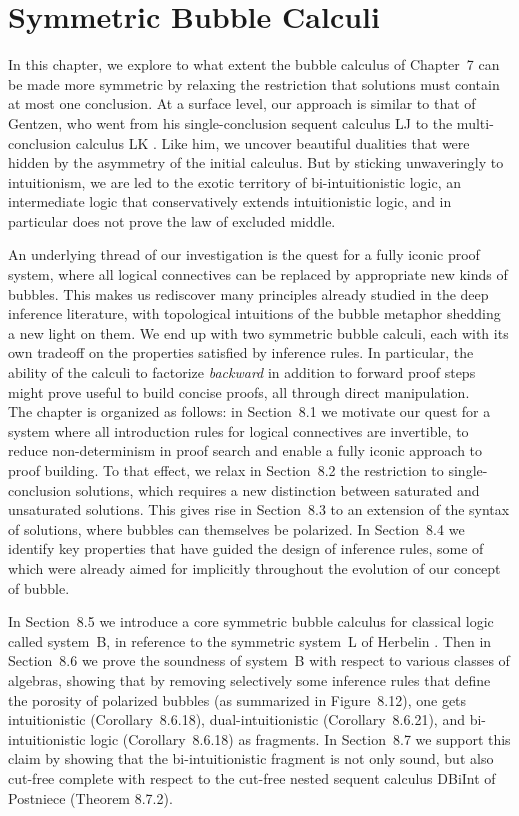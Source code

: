 \documentclass[11pt]{article}
\begin{document}
\section{Symmetric Bubble Calculi}

In this chapter, we explore to what extent the bubble calculus of Chapter~7 can be made more symmetric by relaxing the restriction that solutions must contain at most one conclusion. At a surface level, our approach is similar to that of Gentzen, who went from his single-conclusion sequent calculus LJ to the multi-conclusion calculus LK \cite{gentzen_untersuchungen_1935}. Like him, we uncover beautiful dualities that were hidden by the asymmetry of the initial calculus. But by sticking unwaveringly to intuitionism, we are led to the exotic territory of bi-intuitionistic logic, an intermediate logic that conservatively extends intuitionistic logic, and in particular does not prove the law of excluded middle.

An underlying thread of our investigation is the quest for a fully iconic proof system, where all logical connectives can be replaced by appropriate new kinds of bubbles. This makes us rediscover many principles already studied in the deep inference literature, with topological intuitions of the bubble metaphor shedding a new light on them. We end up with two symmetric bubble calculi, each with its own tradeoff on the properties satisfied by inference rules. In particular, the ability of the calculi to factorize \emph{backward} in addition to forward proof steps might prove useful to build concise proofs, all through direct manipulation.
\\

The chapter is organized as follows: in Section~8.1 we motivate our quest for a system where all introduction rules for logical connectives are invertible, to reduce non-determinism in proof search and enable a fully iconic approach to proof building. To that effect, we relax in Section~8.2 the restriction to single-conclusion solutions, which requires a new distinction between saturated and unsaturated solutions. This gives rise in Section~8.3 to an extension of the syntax of solutions, where bubbles can themselves be polarized. In Section~8.4 we identify key properties that have guided the design of inference rules, some of which were already aimed for implicitly throughout the evolution of our concept of bubble.

In Section~8.5 we introduce a core symmetric bubble calculus for classical logic called system~B, in reference to the symmetric system~L of Herbelin \cite{herbelin_duality_nodate}. Then in Section~8.6 we prove the soundness of system~B with respect to various classes of algebras, showing that by removing selectively some inference rules that define the porosity of polarized bubbles (as summarized in Figure~8.12), one gets intuitionistic (Corollary~8.6.18), dual-intuitionistic (Corollary~8.6.21), and bi-intuitionistic logic (Corollary~8.6.18) as fragments. In Section~8.7 we support this claim by showing that the bi-intuitionistic fragment is not only sound, but also cut-free complete with respect to the cut-free nested sequent calculus DBiInt of Postniece \cite{postniece_deep_2009} (Theorem 8.7.2).
\end{document}
